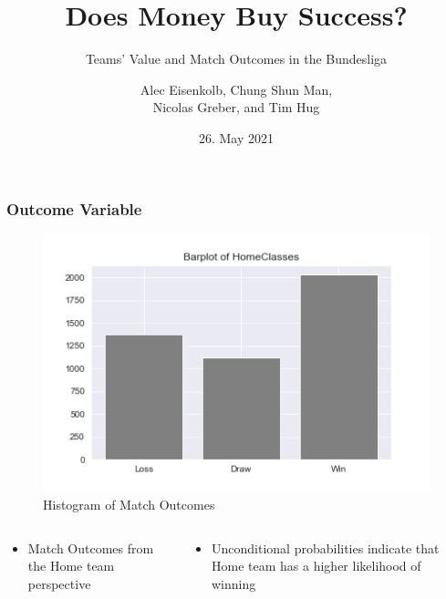 \documentclass{beamer}
\title{Does Money Buy Success?}
\subtitle{\large{Teams' Value and Match Outcomes in the Bundesliga}}
\author{Alec Eisenkolb, Chung Shun Man, \\Nicolas Greber, and Tim Hug} %
\institute{University of St. Gallen \\}
\date{26. May 2021} %
\begin{document}
\begin{frame}

  \maketitle %

\end{frame}




\begin{frame}
\frametitle{Outcome Variable}

\begin{figure}
	\centering
	\includegraphics[scale=0.4]{img/histogram_of_HomeClassesKopie.png}
	\caption{Histogram of Match Outcomes}
\end{figure}

	\begin{columns}[T]
		\begin{column}{.5\textwidth}
			\begin{itemize}
				\item Match Outcomes from the Home team perspective
			\end{itemize}
		\end{column}

		\begin{column}{.5\textwidth}
			\begin{itemize}
				\item Unconditional probabilities indicate that Home team has a higher likelihood of winning
			\end{itemize}
		\end{column}
	\end{columns}

\end{frame}
\end{document}
